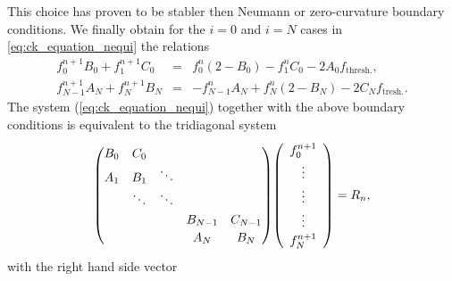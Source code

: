 \documentclass[11pt]{article}
\begin{document}
%
This choice has proven to be stabler then Neumann or zero-curvature boundary conditions. We finally obtain for the $i=0$ and $i=N$ cases in \cref{eq:ck_equation_nequi}  the relations
%
\begin{eqnarray}
  f_0^{n+1} B_0 + f_1^{n+1} C_0  &=& f_0^{n} (2-B_0) - f_1^{n}C_0  - 2A_{0}f_{\text{thresh.}} \label{eq:bc},\\
  f_{N - 1}^{n+1} A_{N}  + f_{N}^{n+1}B_{N} &=& - f_{N-1}^{n} A_{N} + f_{N}^{n}(2 - B_{N}) - 2C_{N} f_{\text{tresh.}}.
\end{eqnarray}
The system (\ref{eq:ck_equation_nequi}) together with the above boundary conditions is equivalent to the tridiagonal system
%
\begin{align}
  \begin{aligned}
    \renewcommand{\arraystretch}{1.2}
    \setlength\arraycolsep{5pt}
    \begin{pmatrix}
      B_0 & C_0  \\ 
      A_1 & B_1 & \ddots   \\
         & \ddots  & \ddots &   \\
         &    &   & B_{N-1} & C_{N-1} \\
         &    &   & A_{N}   & B_{N}
    \end{pmatrix}
  \end{aligned}
  \begin{aligned}
    \left(
    \begin{array}{c}
      f^{n+1}_{0} \\
      \vdots \\
      \vdots \\
      \vdots \\
      f^{n+1}_{N}
    \end{array}
     \right)  
  \end{aligned} 
  = R_n,
  \end{align}
%
with the right hand side vector
%
\end{document}
